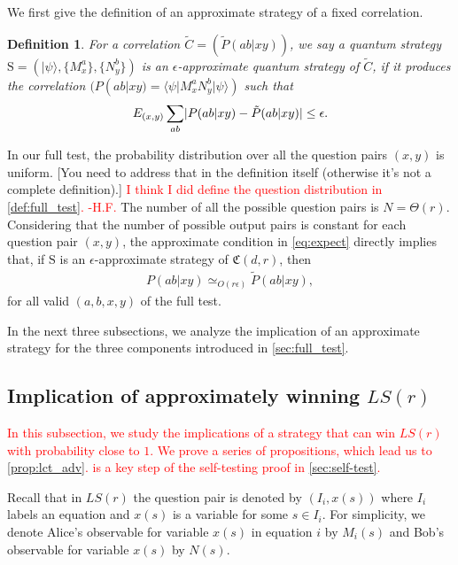 \documentclass[11pt,letterpaper]{article}
\newcommand{\ket}[1]{|#1\rangle}
\newcommand{\bra}[1]{\langle#1|}
\DeclarePairedDelimiter{\abs}{\lvert}{\rvert}
\newcommand{\1}{\mathbb{1}}
\newcommand{\LS}{LS}
\newcommand{\fC}{\mathfrak{C}}
\newcommand{\bS}{\mathrm{S}}
\newcommand{\pr}[2]{P(#1|#2)}
\newcommand{\tpr}[2]{\tilde{P}(#1|#2)}
\newcommand{\ep}{\epsilon}
\newcommand{\appd}[1]{\simeq_{#1}}
\def\carl#1{{\color{blue} #1}}
\newcommand{\hf}[1]{\textcolor{red}{#1}}
\newcommand{\hfc}[1]{\textcolor{red}{#1 -H.F.}}
\newtheorem{definition}[theorem]{Definition}
\theoremstyle{definition}
\begin{document}
We first give the definition of an approximate strategy of a fixed correlation.
\begin{definition}
	For a correlation $\tilde{C} = (\tpr{ab}{xy})$,
	we say a quantum strategy $\bS = (\ket{\psi}, \{M_x^a\}, \{N_y^b\})$
	is an $\ep$-approximate quantum strategy of $\tilde{C}$, 
	if it produces the correlation
	$( \pr{ab}{xy} = \bra{\psi} M_x^a N_y^b \ket{\psi} )$ such that
	\begin{align}
	\label{eq:expect}
	E_{(x,y)} \sum_{ab} \abs{\pr{ab}{xy} - \tpr{ab}{xy}} \leq \ep.
	\end{align}
\end{definition}
In our full test, the probability distribution over all the question pairs $(x,y)$ is uniform.  \carl{[You need to address that in the definition itself (otherwise it's not a complete definition).]}
\hfc{I think I did define the question distribution in \cref{def:full_test}. }
The number of all the possible question pairs is 
$N = \Theta(r)$.
Considering that
the number of possible output pairs is constant for each question pair $(x,y)$, 
the approximate condition in \cref{eq:expect} directly implies that, if $\bS$ is an $\ep$-approximate strategy
of $\fC(d,r)$, then
\begin{align*}
    \pr{ab}{xy} \appd{O(r\ep)} \tpr{ab}{xy},
\end{align*}
for all valid $(a,b,x,y)$ of the full test.

In the next three subsections, we analyze the implication of an approximate strategy for the 
three components introduced in \cref{sec:full_test}.

\subsection{Implication of approximately winning $\LS(r)$}
\label{sec:imp_lct}
\hf{In this subsection, we study the implications of a strategy that can win $\LS(r)$ with probability close to $1$. We prove a series of 
propositions, which lead us to \cref{prop:lct_adv}.
\Cref{prop:lct_adv} is a key step of the self-testing proof in \cref{sec:self-test}.}


Recall that in $\LS(r)$ the question pair is denoted by $(I_i,x(s))$ where $I_i$ 
labels an equation and $x(s)$ is a variable for some $s \in I_i$. 
For simplicity, we denote 
Alice's observable for variable $x(s)$ in equation $i$ by $M_i(s)$ and
Bob's observable for variable $x(s)$ by $N(s)$. 
\end{document}
